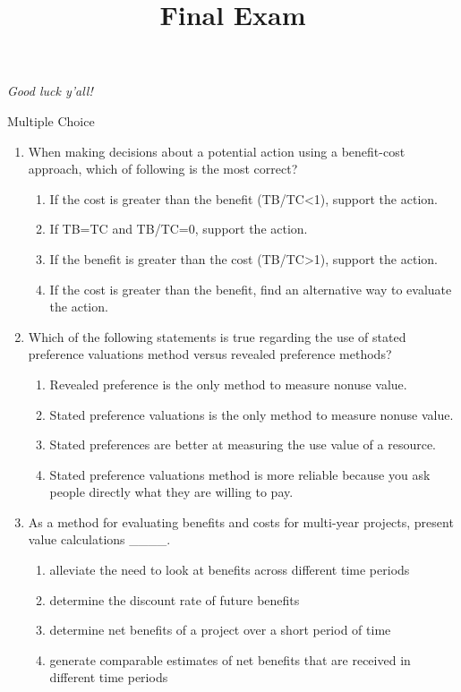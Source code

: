 \documentclass[11pt]{article}
\title{Final Exam}
\newcommand{\answer}[1]{\iftoggle{INCLUDEANSWERS}{{\color{violet!70!white}\textbf{Solution:} #1}}{} }
\newcommand{\points}[1]{\iftoggle{INCLUDEPOINTS}{{\color{blue!70!white}(#1 pts.)}}{}}
\begin{document}
  
\emph{Good luck y'all!}

\vspace*{5mm}
Multiple Choice

\begin{enumerate}
  \item \points{4} When making decisions about a potential action using a benefit-cost approach, which of following is the most correct?
  \begin{enumerate}
    \item If the cost is greater than the benefit (TB/TC<1), support the action.
    \item If TB=TC and TB/TC=0, support the action.
    \item If the benefit is greater than the cost (TB/TC>1), support the action.
    \item If the cost is greater than the benefit, find an alternative way to evaluate the action.
  \end{enumerate}

  \answer{(c) If the benefit-cost ratio is greater than 1 (TB/TC>1), it means that the benefits of the action outweigh its costs, indicating that the action is likely to be profitable and should be supported.}

  \item \points{4} Which of the following statements is true regarding the use of stated preference valuations method versus revealed preference methods?
  \begin{enumerate}
    \item Revealed preference is the only method to measure nonuse value.
    \item Stated preference valuations is the only method to measure nonuse value.
    \item Stated preferences are better at measuring the use value of a resource.
    \item Stated preference valuations method is more reliable because you ask people directly what they are willing to pay.
  \end{enumerate}

  \answer{(b) Revealed preferences can not measure nonuse value. It can only measure how much people are willing to spend to use a resource or have the option to use a resource.}

  \item \points{4} As a method for evaluating benefits and costs for multi-year projects, present value calculations \_\_\_\_.
  \begin{enumerate}
    \item alleviate the need to look at benefits across different time periods
    \item determine the discount rate of future benefits
    \item determine net benefits of a project over a short period of time
    \item generate comparable estimates of net benefits that are received in different time periods
  \end{enumerate}


\end{enumerate}
\end{document}
